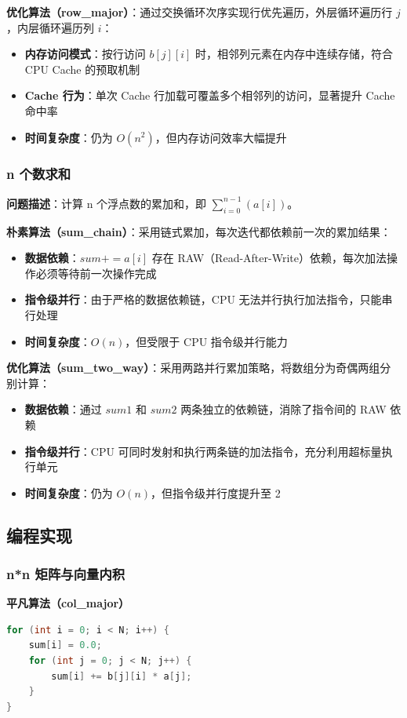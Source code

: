 ﻿\documentclass[9pt,a4paper]{article}
\begin{document}
\textbf{优化算法（row\_major）}：通过交换循环次序实现行优先遍历，外层循环遍历行 $j$，内层循环遍历列 $i$：
\begin{itemize}
    \item \textbf{内存访问模式}：按行访问 $b[j][i]$ 时，相邻列元素在内存中连续存储，符合 CPU Cache 的预取机制
    \item \textbf{Cache 行为}：单次 Cache 行加载可覆盖多个相邻列的访问，显著提升 Cache 命中率
    \item \textbf{时间复杂度}：仍为 $O(n^2)$，但内存访问效率大幅提升
\end{itemize}

\subsubsection{n 个数求和}
\textbf{问题描述}：计算 n 个浮点数的累加和，即 $\sum_{i=0}^{n-1}(a[i])$。

\textbf{朴素算法（sum\_chain）}：采用链式累加，每次迭代都依赖前一次的累加结果：
\begin{itemize}
    \item \textbf{数据依赖}：$sum += a[i]$ 存在 RAW（Read-After-Write）依赖，每次加法操作必须等待前一次操作完成
    \item \textbf{指令级并行}：由于严格的数据依赖链，CPU 无法并行执行加法指令，只能串行处理
    \item \textbf{时间复杂度}：$O(n)$，但受限于 CPU 指令级并行能力
\end{itemize}

\textbf{优化算法（sum\_two\_way）}：采用两路并行累加策略，将数组分为奇偶两组分别计算：
\begin{itemize}
    \item \textbf{数据依赖}：通过 $sum1$ 和 $sum2$ 两条独立的依赖链，消除了指令间的 RAW 依赖
    \item \textbf{指令级并行}：CPU 可同时发射和执行两条链的加法指令，充分利用超标量执行单元
    \item \textbf{时间复杂度}：仍为 $O(n)$，但指令级并行度提升至 2
\end{itemize}

\subsection{编程实现}
\subsubsection{n*n 矩阵与向量内积}
\textbf{平凡算法（col\_major）}
\begin{lstlisting}[language=C++]
for (int i = 0; i < N; i++) {
    sum[i] = 0.0;
    for (int j = 0; j < N; j++) {
        sum[i] += b[j][i] * a[j];
    }
}
\end{lstlisting}
\end{document}
